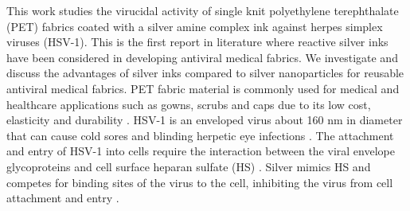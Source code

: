 \documentclass[10pt,letterpaper]{article}
\begin{document}






This work studies the virucidal activity of single knit
polyethylene terephthalate (PET) fabrics coated with a silver amine complex ink \cite{Walker:12}
against herpes simplex viruses (HSV-1). This is the first report in literature where reactive silver inks have been considered in developing antiviral medical fabrics. We investigate and discuss the advantages of silver inks compared to silver nanoparticles for reusable antiviral medical fabrics. 
PET fabric material is commonly used for medical and healthcare applications such as gowns, scrubs and caps due to its low cost, elasticity and durability  \cite{Rigby:97}. 
HSV-1 is an enveloped virus about 160 nm in diameter that can cause cold sores and blinding herpetic eye infections \cite{wald:07}. 
The attachment and entry of HSV-1 into cells require the interaction between the viral envelope glycoproteins and cell surface heparan sulfate (HS) \cite{baram-pinto_2009,akbarzadeh:2018}. Silver mimics HS and competes for binding sites of the virus to the cell, inhibiting the virus from cell attachment and entry \cite{baram-pinto_2009,Galdiero:11}.
\end{document}
